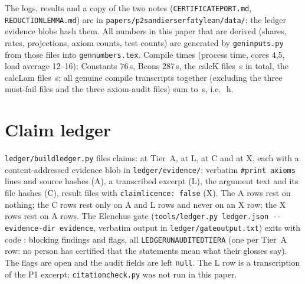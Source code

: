 \documentclass[10pt]{article}
\newcommand{\lean}[1]{\texttt{#1}}
\renewcommand{\_}{\textunderscore\allowbreak}
\begin{document}
The logs, results and a copy of the two notes (\texttt{CERTIFICATE\_PORT.md}, \texttt{REDUCTION\_LEMMA.md}) are in \texttt{papers/p2\_sandier\_serfaty\_lean/data/}; the ledger evidence blobs hash them. All numbers in this paper that are derived (shares, rates, projections, axiom counts, test counts) are generated by \texttt{gen\_inputs.py} from those files into \texttt{gen\_numbers.tex}. Compile times (process time, cores 4,5, load average 12--16): Constants 76\,s, Bcons 287\,s, the calcK files \PTCalcKAllSec\,s in total, the calcLam files \PTCalcLamAllSec\,s; all genuine compile transcripts together (excluding the three must-fail files and the three axiom-audit files) sum to \PTCompileTotalSec\,s, i.e.\ \PTCompileTotalH\,h.

\section{Claim ledger}\label{sec:ledger}
\texttt{ledger/build\_ledger.py} files \PTLedgerN{} claims: \PTLedgerA{} at Tier~A, \PTLedgerL{} at L, \PTLedgerC{} at C and \PTLedgerX{} at X, each with a content-addressed evidence blob in \texttt{ledger/evidence/}: verbatim \lean{\#print axioms} lines and source hashes (A), a transcribed excerpt (L), the argument text and its file hashes (C), result files with \texttt{claim\_licence: false} (X). The A rows rest on nothing; the C rows rest only on A and L rows and never on an X row; the X rows rest on A rows. The Elenchus gate (\texttt{tools/ledger.py ledger.json -{}-evidence-dir evidence}, verbatim output in \texttt{ledger/gate\_output.txt}) exits with code \textbf{\PTGateExit}: \PTGateBlock{} blocking findings and \PTGateFlag{} flags, all \texttt{LEDGER\_UNAUDITED\_TIER\_A} (one per Tier~A row: no person has certified that the statements mean what their glosses say). The flags are open and the audit fields are left \texttt{null}. The L row is a transcription of the P1 excerpt; \texttt{citation\_check.py} was not run in this paper.
\end{document}
